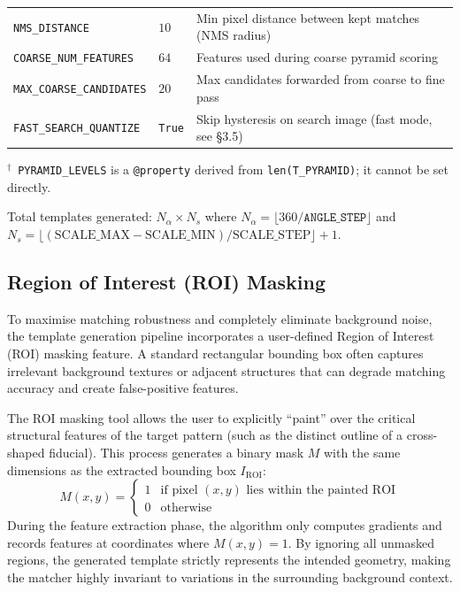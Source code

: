 \documentclass[12pt,a4paper]{article}
\begin{document}
\begin{table}[H]
\begin{tabular}{p{5.2cm}p{3.2cm}p{5.5cm}}
    \texttt{NMS\_DISTANCE}                & $10$                        & Min pixel distance between kept matches (NMS radius)                \\
    \texttt{COARSE\_NUM\_FEATURES}        & $64$                        & Features used during coarse pyramid scoring                         \\
    \texttt{MAX\_COARSE\_CANDIDATES}      & $20$                        & Max candidates forwarded from coarse to fine pass                   \\
    \texttt{FAST\_SEARCH\_QUANTIZE}       & \texttt{True}               & Skip hysteresis on search image (fast mode, see §3.5)               \\
    \bottomrule
  \end{tabular}
\end{table}
{\small $^\dagger$~\texttt{PYRAMID\_LEVELS} is a \texttt{@property} derived from
\texttt{len(T\_PYRAMID)}; it cannot be set directly.}

Total templates generated: $N_\alpha \times N_s$ where
$N_\alpha = \lfloor 360/\texttt{ANGLE\_STEP}\rfloor$ and
$N_s = \lfloor(\text{SCALE\_MAX} - \text{SCALE\_MIN})/\text{SCALE\_STEP}\rfloor + 1$.

\subsection{Region of Interest (ROI) Masking}
To maximise matching robustness and completely eliminate background noise, the
template generation pipeline incorporates a user-defined Region of Interest (ROI)
masking feature.  A standard rectangular bounding box often captures irrelevant
background textures or adjacent structures that can degrade matching accuracy and
create false-positive features.

The ROI masking tool allows the user to explicitly ``paint'' over the critical
structural features of the target pattern (such as the distinct outline of a
cross-shaped fiducial).  This process generates a binary mask $M$ with the same
dimensions as the extracted bounding box $I_\text{ROI}$:
\begin{equation}
  M(x,y) =
  \begin{cases}
    1 & \text{if pixel } (x,y) \text{ lies within the painted ROI} \\
    0 & \text{otherwise}
  \end{cases}
\end{equation}
During the feature extraction phase, the algorithm only computes gradients and
records features at coordinates where $M(x,y) = 1$.  By ignoring all unmasked
regions, the generated template strictly represents the intended geometry, making the
matcher highly invariant to variations in the surrounding background context.
\end{document}
